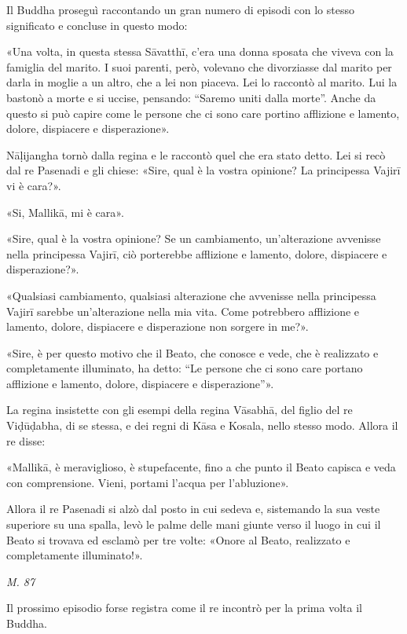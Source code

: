  Il Buddha proseguì raccontando un gran numero di
episodi con lo stesso significato e concluse in questo modo:


 «Una volta, in questa stessa Sāvatthī, c’era una donna
sposata che viveva con la famiglia del marito. I suoi parenti, però,
volevano che divorziasse dal marito per darla in moglie a un altro, che
a lei non piaceva. Lei lo raccontò al marito. Lui la bastonò a morte e
si uccise, pensando: “Saremo uniti dalla morte”. Anche da questo si può
capire come le persone che ci sono care portino afflizione e lamento,
dolore, dispiacere e disperazione».


Nāḷijangha tornò dalla regina e le raccontò quel che era stato detto.
Lei si recò dal re Pasenadi e gli chiese: «Sire, qual è la vostra
opinione? La principessa Vajirī vi è cara?».


«Si, Mallikā, mi è cara».


«Sire, qual è la vostra opinione? Se un cambiamento, un’alterazione
avvenisse nella principessa Vajirī, ciò porterebbe afflizione e lamento,
dolore, dispiacere e disperazione?».


«Qualsiasi cambiamento, qualsiasi alterazione che avvenisse nella
principessa Vajirī sarebbe un’alterazione nella mia vita. Come
potrebbero afflizione e lamento, dolore, dispiacere e disperazione non
sorgere in me?».


«Sire, è per questo motivo che il Beato, che conosce e vede, che è
realizzato e completamente illuminato, ha detto: “Le persone che ci sono
care portano afflizione e lamento, dolore, dispiacere e disperazione”».


 La regina insistette con gli esempi della regina
Vāsabhā, del figlio del re Viḍūḍabha, di se stessa, e dei regni di Kāsa
e Kosala, nello stesso modo. Allora il re disse:


 «Mallikā, è meraviglioso, è stupefacente, fino a che punto
il Beato capisca e veda con comprensione. Vieni, portami l’acqua per
l’abluzione».


Allora il re Pasenadi si alzò dal posto in cui sedeva e, sistemando la
sua veste superiore su una spalla, levò le palme delle mani giunte verso
il luogo in cui il Beato si trovava ed esclamò per tre volte: «Onore al
Beato, realizzato e completamente illuminato!».


\emph{M. 87}


 Il prossimo episodio forse registra come il re
incontrò per la prima volta il Buddha.


